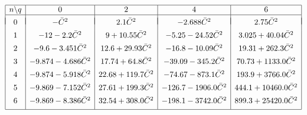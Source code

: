 \documentclass[12pt,a5paper]{article}
\begin{document}
\begin{table}[hbtp]
\centering
\[
\begin{array}{|c|c|c|c|c|}
\hline
n\backslash q & 0 & 2 & 4 & 6\\ %
\hline
&&&&\\[-2ex]
0 & -\bar{C}^2 & 2.1\bar{C}^2 & -2.688\bar{C}^2
 & 2.75\bar{C}^2
\\[1ex]
1 & -12-2.2\bar{C}^2 
  & 9+10.55\bar{C}^2
  & -5.25-24.52\bar{C}^2
  & 3.025+40.04\bar{C}^2
\\[1ex]
2  & -9.6-3.451\bar{C}^2
 & 12.6+29.93\bar{C}^2
 & -16.8-10.09\bar{C}^2
 & 19.31+262.3\bar{C}^2
\\[1ex]
3 & -9.874-4.686\bar{C}^2
 & 17.74+64.8\bar{C}^2
 & -39.09-345.2\bar{C}^2
 & 70.73+1133.0\bar{C}^2
\\[1ex]
4 & -9.874-5.918\bar{C}^2
  & 22.68+119.7\bar{C}^2
  & -74.67-873.1\bar{C}^2
  & 193.9+3766.0\bar{C}^2
\\[1ex]
5 & -9.869-7.152\bar{C}^2
 & 27.61+199.3\bar{C}^2
 & -126.7-1906.0\bar{C}^2
 & 444.1+10460.0\bar{C}^2
\\[1ex]
6 & -9.869-8.386\bar{C}^2
  & 32.54+308.0\bar{C}^2
  & -198.1-3742.0\bar{C}^2
  & 899.3+25420.0\bar{C}^2
\\[1ex]
\hline
\end{array}
\]
\caption{The coefficients of the partial sums $\sum_{p=0}^{n}\gamma^p\grave{\kappa}^q$ in the 
asymptotic expansion of $\Re\bar{\lambda}$ about $\grave{\kappa}=\pi-\kappa=0$ 
for leading values of $n$ and $q$, up to ${\cal O}(\gamma^{n+1},\bar{C}^3)$.
 The special case of $q=0$ gives the stability of the sawtooth mode.}
\label{tab:partial:kappa:pi}
\end{table}
\end{document}
